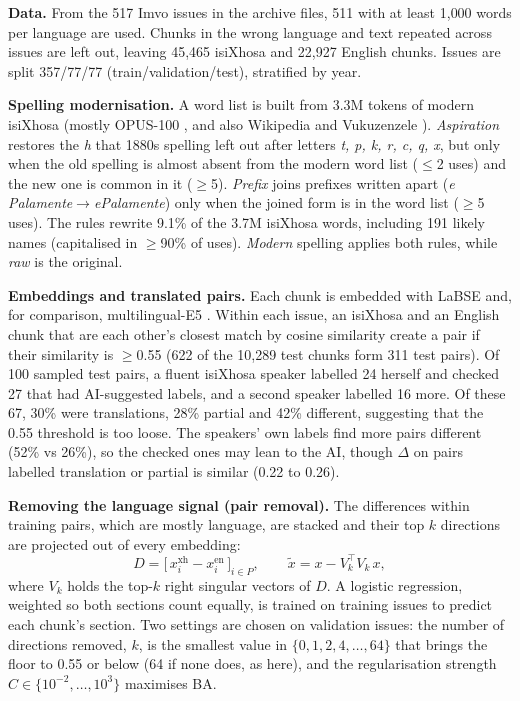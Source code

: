 \documentclass[10pt,letterpaper]{article}
\begin{document}
\textbf{Data.} From the 517 Imvo issues in the archive files, 511 with at least 1{,}000 words per language are used. Chunks in the wrong language and text repeated across
issues are left out, leaving 45{,}465 isiXhosa and 22{,}927 English chunks. Issues are split 357/77/77
(train/validation/test), stratified by year.

\textbf{Spelling modernisation.} A word list is built from 3.3M tokens of modern isiXhosa (mostly OPUS-100
\citep{opus}, and also Wikipedia and Vukuzenzele \citep{vuk}). \emph{Aspiration} restores the \emph{h} that
1880s spelling left out after letters \emph{t, p, k, r, c, q, x}, but only when
the old spelling is almost absent from the modern word list ($\leq$2 uses) and the new one is common in it
($\geq$5). \emph{Prefix} joins prefixes written apart (\emph{e Palamente}$\to$\emph{ePalamente})
only when the joined form is in the word list ($\geq$5 uses). The rules rewrite 9.1\% of the 3.7M isiXhosa words, including 191
likely names (capitalised in $\geq$90\% of uses). \emph{Modern} spelling applies both rules, while \emph{raw} is the original.

\textbf{Embeddings and translated pairs.} Each chunk is embedded with LaBSE and, for comparison,
multilingual-E5 \citep{e5}. Within each issue, an isiXhosa and an English chunk that are each other's
closest match by cosine similarity create a pair if their similarity is $\geq$0.55 (622 of the 10{,}289
test chunks form 311 test pairs). Of 100 sampled test pairs, a fluent isiXhosa speaker labelled 24 herself and checked 27 that had AI-suggested labels, and a second speaker labelled 16 more. Of these 67, 30\% were translations, 28\% partial and 42\% different, suggesting that the 0.55 threshold is too loose. The speakers' own labels find more pairs different (52\% vs 26\%), so the checked ones may lean to the AI, though $\Delta$ on pairs labelled translation or partial is similar (0.22 to 0.26).

\textbf{Removing the language signal (pair removal).} The differences within training pairs, which are mostly language, are stacked and their top $k$
directions are projected out of every embedding:
\begin{equation}
D=\big[\,x^{\mathrm{xh}}_i-x^{\mathrm{en}}_i\,\big]_{i\in P},\qquad
\tilde{x}=x-V_k^{\top}V_k\,x,
\end{equation}
where $V_k$ holds the top-$k$ right singular vectors of $D$. A logistic regression, weighted so both
sections count equally, is trained on training issues to predict each chunk's section. Two settings are chosen on validation
issues: the number of directions removed, $k$, is the smallest value in $\{0,1,2,4,\dots,64\}$ that brings
the floor to 0.55 or below (64 if none does, as here), and the regularisation strength $C\in\{10^{-2},\dots,10^{3}\}$
maximises BA.
\end{document}
